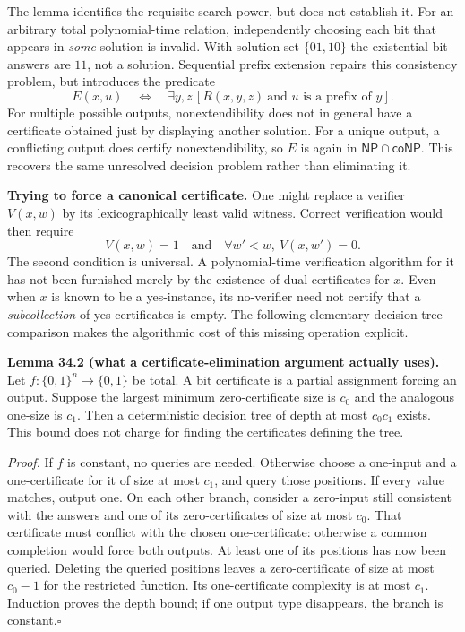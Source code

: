 \documentclass[11pt,a4paper]{article}
\numberwithin{equation}{section}
\begin{document}
The lemma identifies the requisite search power, but does not establish it.
For an arbitrary total polynomial-time relation, independently choosing each
bit that appears in \emph{some} solution is invalid. With solution set
$\{01,10\}$ the existential bit answers are $11$, not a solution. Sequential
prefix extension repairs this consistency problem, but introduces the
predicate
\begin{equation}\label{r34:prefix}
 E(x,u)\quad\Longleftrightarrow\quad
 \exists y,z\,[R(x,y,z)\ \text{and }u\text{ is a prefix of }y].
\end{equation}
For multiple possible outputs, nonextendibility does not in general have a
certificate obtained just by displaying another solution. For a unique output,
a conflicting output does certify nonextendibility, so $E$ is again in
$\mathsf{NP}\cap\mathsf{coNP}$. This recovers the same unresolved decision
problem rather than eliminating it.

\medskip
\textbf{Trying to force a canonical certificate.}
One might replace a verifier $V(x,w)$ by its lexicographically least valid
witness. Correct verification would then require
\[
 V(x,w)=1\quad\text{and}\quad
              \forall w'<w,\ V(x,w')=0.
\]
The second condition is universal. A polynomial-time verification algorithm
for it has not been furnished merely by the existence of dual certificates
for $x$. Even when $x$ is known to be a yes-instance, its no-verifier need
not certify that a \emph{subcollection} of yes-certificates is empty.
The following elementary decision-tree comparison makes the algorithmic
cost of this missing operation explicit.

\textbf{Lemma 34.2 (what a certificate-elimination argument actually uses).}
Let $f:\{0,1\}^n\to\{0,1\}$ be total. A bit certificate is a partial
assignment forcing an output. Suppose the largest minimum zero-certificate
size is $c_0$ and the analogous one-size is $c_1$. Then a deterministic
decision tree of depth at most $c_0c_1$ exists. This bound does not charge for
finding the certificates defining the tree.

\emph{Proof.} If $f$ is constant, no queries are needed. Otherwise choose
a one-input and a one-certificate for it of size at most $c_1$, and query
those positions. If every value matches, output one. On each other branch,
consider a zero-input still consistent with the answers and one of its
zero-certificates of size at most $c_0$. That certificate must conflict with
the chosen one-certificate: otherwise a common completion would force both
outputs. At least one of its positions has now been queried. Deleting the
queried positions leaves a zero-certificate of size at most $c_0-1$ for the
restricted function. Its one-certificate complexity is at most $c_1$.
Induction proves the depth bound; if one output type disappears, the branch
is constant.\hfill$\square$
\end{document}
